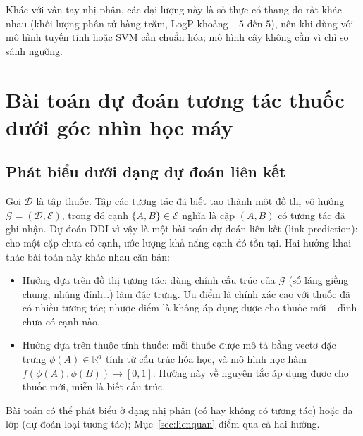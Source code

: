\documentclass[12pt,a4paper,oneside]{report}
\begin{document}
Khác với vân tay nhị phân, các đại lượng này là số thực có thang đo rất khác
nhau (khối lượng phân tử hàng trăm, LogP khoảng $-5$ đến $5$), nên khi dùng với
mô hình tuyến tính hoặc SVM cần chuẩn hóa; mô hình cây không cần vì chỉ so sánh
ngưỡng.

\section{Bài toán dự đoán tương tác thuốc dưới góc nhìn học máy}
\label{sec:ddihocmay}

\subsection{Phát biểu dưới dạng dự đoán liên kết}
Gọi $\mathcal{D}$ là tập thuốc. Tập các tương tác đã biết tạo thành một đồ thị
vô hướng $\mathcal{G} = (\mathcal{D}, \mathcal{E})$, trong đó cạnh
$\{A, B\} \in \mathcal{E}$ nghĩa là cặp $(A, B)$ có tương tác đã ghi nhận. Dự
đoán DDI vì vậy là một bài toán dự đoán liên kết (link prediction): cho
một cặp chưa có cạnh, ước lượng khả năng cạnh đó tồn tại. Hai hướng khai thác
bài toán này khác nhau căn bản:
\begin{itemize}
  \item Hướng dựa trên đồ thị tương tác: dùng chính cấu trúc của
        $\mathcal{G}$ (số láng giềng chung, nhúng đỉnh\dots) làm đặc trưng. Ưu
        điểm là chính xác cao với thuốc đã có nhiều tương tác; nhược điểm là
        không áp dụng được cho thuốc mới -- đỉnh chưa có cạnh nào.
  \item Hướng dựa trên thuộc tính thuốc: mỗi thuốc
        được mô tả bằng vectơ đặc trưng $\phi(A) \in \mathbb{R}^{d}$ tính từ cấu
        trúc hóa học, và mô hình học hàm $f(\phi(A), \phi(B)) \to [0,1]$. Hướng
        này về nguyên tắc áp dụng được cho thuốc mới, miễn là biết cấu trúc.
\end{itemize}
Bài toán có thể phát biểu ở dạng nhị phân (có hay không có tương tác) hoặc đa
lớp (dự đoán loại tương tác); Mục~\ref{sec:lienquan} điểm qua cả hai hướng.
\end{document}
